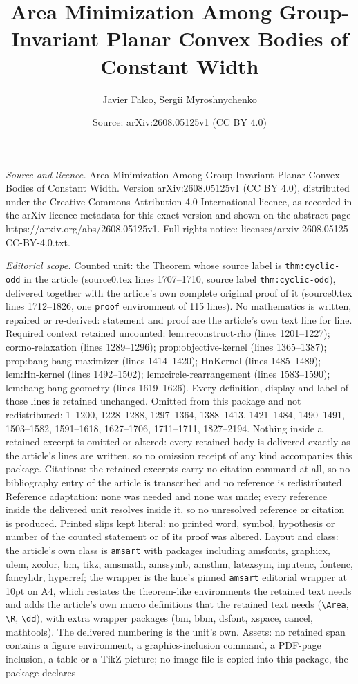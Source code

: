 \documentclass[10pt,a4paper]{amsart}
\title[Area Minimization Among Group-Invariant Planar Convex Bodies]{Area Minimization Among Group-Invariant Planar Convex Bodies of Constant Width}
\author{Javier Falco, Sergii Myroshnychenko}
\date{Source: arXiv:2608.05125v1 (CC BY 4.0)}
\begin{document}
\maketitle

\noindent\emph{Source and licence.} Area Minimization Among Group-Invariant Planar Convex Bodies of Constant Width. Version arXiv:2608.05125v1 (CC BY 4.0), distributed under the Creative Commons Attribution 4.0 International licence, as recorded in the arXiv licence metadata for this exact version and shown on the abstract page https://arxiv.org/abs/2608.05125v1. Full rights notice: licenses/arxiv-2608.05125-CC-BY-4.0.txt.\par\smallskip

\noindent\textit{Editorial scope.} Counted unit: the Theorem whose source label is \texttt{thm:cyclic-odd} in the article (source0.tex lines 1707--1710, source label \texttt{thm:cyclic-odd}), delivered together with the article's own complete original proof of it (source0.tex lines 1712--1826, one \texttt{proof} environment of 115 lines). No mathematics is written, repaired or re-derived: statement and proof are the article's own text line for line. Required context retained uncounted: lem:reconstruct-rho (lines 1201--1227); cor:no-relaxation (lines 1289--1296); prop:objective-kernel (lines 1365--1387); prop:bang-bang-maximizer (lines 1414--1420); HnKernel (lines 1485--1489); lem:Hn-kernel (lines 1492--1502); lem:circle-rearrangement (lines 1583--1590); lem:bang-bang-geometry (lines 1619--1626). Every definition, display and label of those lines is retained unchanged. Omitted from this package and not redistributed: 1--1200, 1228--1288, 1297--1364, 1388--1413, 1421--1484, 1490--1491, 1503--1582, 1591--1618, 1627--1706, 1711--1711, 1827--2194. Nothing inside a retained excerpt is omitted or altered: every retained body is delivered exactly as the article's lines are written, so no omission receipt of any kind accompanies this package. Citations: the retained excerpts carry no citation command at all, so no bibliography entry of the article is transcribed and no reference is redistributed. Reference adaptation: none was needed and none was made; every reference inside the delivered unit resolves inside it, so no unresolved reference or citation is produced. Printed slips kept literal: no printed word, symbol, hypothesis or number of the counted statement or of its proof was altered. Layout and class: the article's own class is \texttt{amsart} with packages including amsfonts, graphicx, ulem, xcolor, bm, tikz, amsmath, amssymb, amsthm, latexsym, inputenc, fontenc, fancyhdr, hyperref; the wrapper is the lane's pinned \texttt{amsart} editorial wrapper at 10pt on A4, which restates the theorem-like environments the retained text needs and adds the article's own macro definitions that the retained text needs (\texttt{\textbackslash Area}, \texttt{\textbackslash R}, \texttt{\textbackslash dd}), with extra wrapper packages (bm, bbm, dsfont, xspace, cancel, mathtools). The delivered numbering is the unit's own. Assets: no retained span contains a figure environment, a graphics-inclusion command, a PDF-page inclusion, a table or a TikZ picture; no image file is copied into this package, the package declares 
\end{document}
